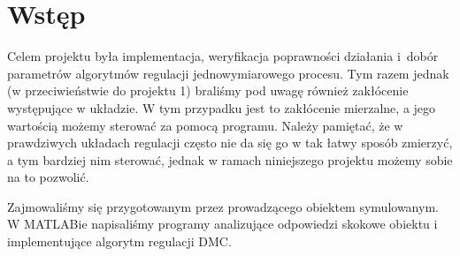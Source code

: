 \chapter{Wstęp}

Celem projektu była implementacja, weryfikacja poprawności działania i~dobór parametrów algorytmów regulacji jednowymiarowego procesu. Tym razem jednak (w przeciwieństwie do projektu 1) braliśmy pod uwagę również zakłócenie występujące w układzie. W tym przypadku jest to zakłócenie mierzalne, a jego wartością możemy sterować za pomocą programu. Należy pamiętać, że w prawdziwych układach regulacji często nie da się go w tak łatwy sposób zmierzyć, a tym bardziej nim sterować, jednak w ramach niniejszego projektu możemy sobie na to pozwolić.


Zajmowaliśmy się przygotowanym przez prowadzącego obiektem symulowanym. W MATLABie napisaliśmy programy analizujące odpowiedzi skokowe obiektu i implementujące algorytm regulacji DMC.